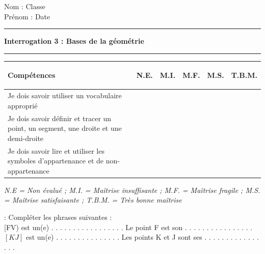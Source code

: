 \documentclass[a4paper,11pt]{article}
\newcounter{numexo}
\newcommand{\exo}[1]{\stepcounter{numexo}\noindent{\bf Exercice~\thenumexo} : \marginpar{\hfill /#1}}
\newcommand{\titre}[5] 
{
\noindent #2 \hfill #4 \\
#3 \hfill #5

\vspace{-1.6cm}

\begin{center}\rule{6cm}{0.5mm}\end{center}
\vspace{0.2cm}
\begin{center}{\large{\textbf{#1}}}\end{center}
\begin{center}\rule{6cm}{0.5mm}\end{center}
}
\begin{document}
\pagestyle{empty}
\titre{Interrogation 3 : Bases de la géométrie}{Nom :}{Prénom :}{Classe}{Date}

\vspace*{0.5cm}
\begin{flushleft}
\begin{tabular}{|m{9.5cm}|m{1.25cm}|m{1.25cm}|m{1.25cm}|m{1.25cm}|m{1.25cm}|}
\hline 
\textbf{Compétences} & \begin{center}
\textbf{N.E.}
\end{center} & \begin{center}
\textbf{M.I.}
\end{center} & \begin{center}
\textbf{M.F.}
\end{center}  & \begin{center}
\textbf{M.S.}
\end{center} & \begin{center}
\textbf{T.B.M.}
\end{center} \\ 
\hline 
Je dois savoir utiliser un vocabulaire approprié &  &  & & &\\
\hline 
Je dois savoir définir et tracer un point, un segment, une droite et une demi-droite &  &  & & &\\
\hline
Je dois savoir lire et utiliser les symboles d'appartenance et de non-appartenance &  &  & & &\\ 
\hline

\end{tabular} 
\end{flushleft}

\textit{N.E = Non évalué ; M.I. = Maîtrise insuffisante ; M.F. = Maîtrise fragile ; M.S. = Maîtrise satisfaisante ; T.B.M. = Très bonne maîtrise}\\


\vspace*{0.5cm}


\exo{2}  Compléter les phrases suivantes :\\


[FV) est un(e) . . . . . . . . . . . . . . . . . \hspace*{0.5cm} Le point F est son . . . . . . . . . . . . . . . .\\


$[KJ]$ est un(e) . . . . . . . . . . . . . . . \hspace*{0.5cm} Les points K et J sont ses . . . . . . . . . . . . . . . .\\
\end{document}
